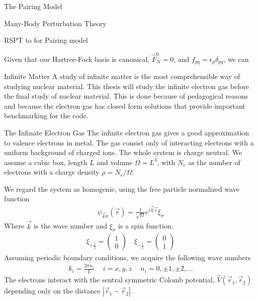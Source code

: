 \documentclass[twoside,english]{uiofysmaster}
\begin{document}
\begin{chapter}{The Pairing Model}
\begin{section}{Many-Body Perturbation Theory}
 	\begin{subsection}{RSPT to for Pairing model}
 		
 		Given that our Hartree-Fock basis is canonical, $\hat F_N^0 = 0$, and $f_{pq} = \epsilon_p \delta_{pq}$, we can
  	\end{subsection}


 \end{section}

\end{chapter}




\begin{chapter}{Infinite Matter}
	A study of infinite matter is the most comprehensible way of studying nuclear material. This thesis will study the infinite electron gas before the final study of nuclear material. This is done because of pedagogical reasons and because the electron gas has closed form solutions that provide important benchmarking for the code. 
	\begin{section}{The Infinate Electron Gas}
		The infinite electron gas gives a good approximation to valence electrons in metal. The gas consist only of interacting electrons with a uniform background of charged ions. The whole system is charge neutral. We assume a cubic box, length $L$ and volume $\Omega = L^3$, with $N_e$ as the number of electrons with a charge density $\rho = N_e / \Omega$.

		We regard the system as homogenic, using the free particle normalized wave function
		\begin{align}
		 	\psi_{\vec k \sigma} (\vec r) = \frac{1}{\sqrt{\Omega}} e^{i \vec k \vec r} \xi_{\sigma}
		 \end{align}
		 Where $\vec k$ is the wave number and $\xi_{\sigma}$ is a spin function. 
		 \begin{align}
		 	\xi_{+\frac{1}{2}} = \left( \begin{matrix} 1 \\ 0 \end{matrix} \right) \:\;\:\; \xi_{-\frac{1}{2}} = \left( \begin{matrix} 0 \\ 1 \end{matrix} \right)
		 \end{align}
		 Assuming periodic boundary conditions, we acquire the following wave numbers
		 \begin{align}
		 	k_i = \frac{2\pi n_i}{L} \:\:\:\;\; i = x,y,z \;\;\:\:\: n_i = 0, \pm 1, \pm 2, ...
		 \end{align}
		 The electrons interact with the sentral symmetric Colomb potential, $\hat V(\vec r_1, \vec r_2)$ depending only on the distance $\left| \vec r_1 - \vec r_2 \right|$. 


\end{section}
\end{chapter}
\end{document}
